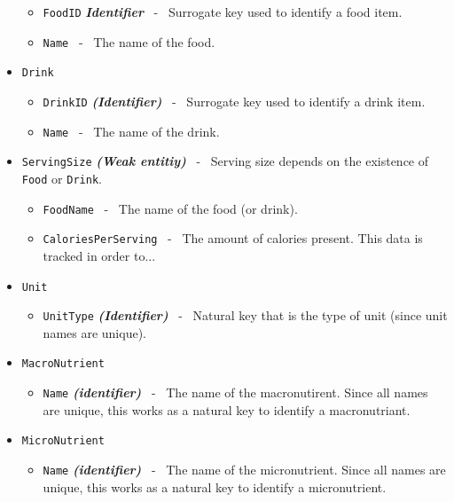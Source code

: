 \documentclass[letterpaper, 11pt]{article}
\newcommand{\1}{\mathds{1}}	%
\theoremstyle{definition}
\begin{document}
\begin{itemize}
        \begin{itemize}[label=$\circ$]
            \item \texttt{FoodID} \textit{\textbf{Identifier}} \ - \ Surrogate key used to identify a food item.
            \item \texttt{Name} \ - \ The name of the food.
        \end{itemize}
    \item \texttt{Drink}
        \begin{itemize}[label=$\circ$]
            \item \texttt{DrinkID} \textit{\textbf{(Identifier)}} \ - \ Surrogate key used to identify a drink item.
            \item \texttt{Name} \ - \ The name of the drink.
        \end{itemize}
            \item \texttt{ServingSize} \textit{\textbf{(Weak entitiy)}} \ - \ Serving size depends on the existence of \texttt{Food} or \texttt{Drink}.
                \begin{itemize}[label=$\circ$]
            \item \texttt{FoodName} \ - \ The name of the food (or drink).
            \item \texttt{CaloriesPerServing} \ - \ The amount of calories present. This data is tracked in order to...
                \end{itemize}
        \begin{itemize}[label=$\circ$]
        \end{itemize}
    \item \texttt{Unit}
        \begin{itemize}[label=$\circ$]
            \item \texttt{UnitType} \textit{\textbf{(Identifier)}} \ - \ Natural key that is the type of unit (since unit names are unique).
        \end{itemize}
    \item\texttt{MacroNutrient}
        \begin{itemize}[label=$\circ$]
            \item \texttt{Name} \textit{\textbf{(identifier)}} \ - \ The name of the macronutirent. Since all names are unique, this works as a natural key to identify a macronutriant.
        \end{itemize}
    \item\texttt{MicroNutrient}
        \begin{itemize}[label=$\circ$]
            \item \texttt{Name} \textit{\textbf{(identifier)}} \ - \ The name of the micronutrient. Since all names are unique, this works as a natural key to identify a micronutrient.

\end{itemize}
\end{itemize}
\end{document}
